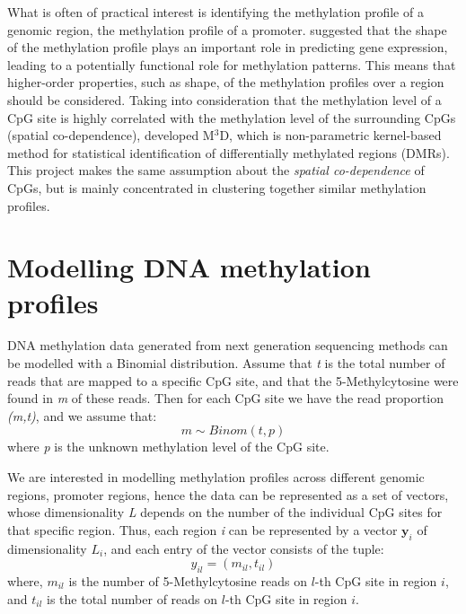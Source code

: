 What is often of practical interest is identifying the methylation profile of a genomic region, \eg the methylation profile of a promoter. \cite{Vanderkraats2013} suggested that the shape of the methylation profile plays an important role in predicting gene expression, leading to a potentially functional role for methylation patterns. This means that higher-order properties, such as shape, of the methylation profiles over a region should be considered. Taking into consideration that the methylation level of a CpG site is highly correlated with the methylation level of the surrounding CpGs (\ie spatial co-dependence), \cite{Mayo2014} developed M$^3$D, which is non-parametric kernel-based method for statistical identification of differentially methylated regions (DMRs). This project makes the same assumption about the \emph{spatial co-dependence} of CpGs, but is mainly concentrated in clustering together similar methylation profiles.



\section{Modelling DNA methylation profiles} \label{model-meth-profiles-s}
DNA methylation data generated from next generation sequencing methods can be modelled with a Binomial distribution. Assume that \emph{t} is the total number of reads that are mapped to a specific CpG site, and that the 5-Methylcytosine were found in \emph{m} of these reads. Then for each CpG site we have the read proportion \emph{(m,t)}, and we assume that:
\begin{equation} \label{binom-1d-f}
	m \sim Binom(t, p)
\end{equation}
where \emph{p} is the unknown methylation level of the CpG site.

We are interested in modelling methylation profiles across different genomic regions, \eg promoter regions, hence the data can be represented as a set of vectors, whose dimensionality \emph{L} depends on the number of the individual CpG sites for that specific region. Thus, each region \emph{i} can be represented by a vector $\mathbf{y}_{i}$ of dimensionality $L_{i}$, and each entry of the vector consists of the tuple:
\begin{equation}
	y_{il} = (m_{il},t_{il})
\end{equation}
where, $m_{il}$ is the number of 5-Methylcytosine reads on $l$-th CpG site in region $i$, and $t_{il}$ is the total number of reads on $l$-th CpG site in region $i$. 

